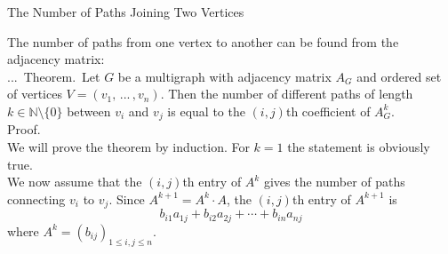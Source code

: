 \documentclass[smaller,hyperref={CJKbookmarks=true}]{beamer}
\newcommand{\N}{\mathbb{N}} \newcommand{\Z}{\mathbb{Z}} \newcommand{\Q}{\mathbb{Q}}
\newcounter{zhuo}[subsection]
\renewcommand{\thezhuo}{\thesection.\thesubsection.\arabic{zhuo}}
\newenvironment{THEOREM}{\stepcounter{zhuo}\alert{\thezhuo.~Theorem.\,}}{}
\begin{document}
\begin{frame}[t]{The Number of Paths Joining Two Vertices}
\begin{spacing}{1.05}
The number of paths from one vertex to another can be found from the
adjacency matrix:\\[6pt]
\begin{THEOREM}
Let $G$ be a multigraph with adjacency matrix $A_G$ and ordered set of vertices $V=(v_1,\,...\,,v_n)$. Then the number of different paths of length $k\in\N\setminus\{0\}$ between $v_i$ and $v_j$ is equal to the $(i,j)$th coefficient of $A_G^k$.\\[6pt]
\end{THEOREM}
\alert{Proof.}\\
We will prove the theorem by induction. For $k=1$ the statement is obviously true.\\[6pt]
We now assume that the $(i,j)$th entry of $A^k$ gives the number of paths connecting $v_i$ to $v_j$. Since $A^{k+1}=A^k\cdot A$, the $(i,j)$th entry of $A^{k+1}$ is
\setcounter{equation}{0}
\begin{equation}\label{3.2.1}
b_{i1}a_{1j}+b_{i2}a_{2j}+\cdots+b_{in}a_{nj}
\end{equation}
where $A^k=(b_{ij})_{1\leq i,j\leq n}$.
\end{spacing}
\end{frame}
\end{document}
